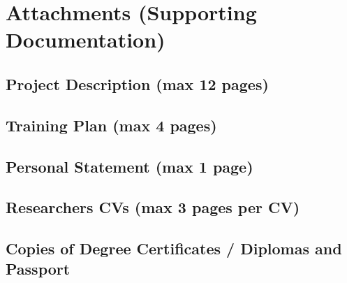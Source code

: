 \documentclass[11pt,twoside,a4paper]{article}
\begin{document}
\section{Attachments (Supporting Documentation)}

\subsection{Project Description (max 12 pages)}


\subsection{Training Plan (max 4 pages)}

\subsection{Personal Statement (max 1 page)}

\subsection{Researchers CVs (max 3 pages per CV)}



\subsection{Copies of Degree Certificates / Diplomas and Passport}

\end{document}
